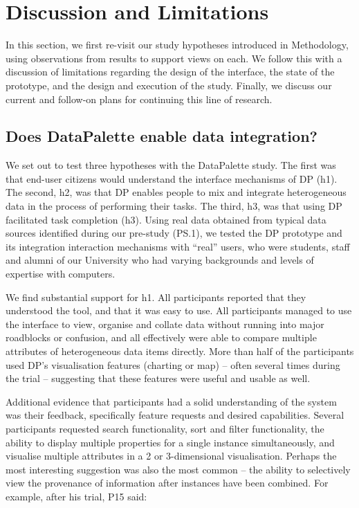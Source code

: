 \documentclass{sigchi}
\begin{document}
\section{Discussion and Limitations}

In this section, we first re-visit our study hypotheses introduced in Methodology, using observations from results to support views on each.  We follow this with a discussion of limitations regarding the design of the interface, the state of the prototype, and the design and execution of the study.  Finally, we discuss our current and follow-on plans for continuing this line of research.

\subsection{Does DataPalette enable data integration?}

We set out to test three hypotheses with the DataPalette study. The first was that end-user citizens would understand the interface mechanisms of DP (h1).  The second, h2, was that DP enables people to mix and integrate heterogeneous data in the process of performing their tasks.  The third, h3, was that using DP facilitated task completion (h3).  Using real data obtained from typical data sources identified during our pre-study (PS.1), we tested the DP prototype and its integration interaction mechanisms with ``real'' users, who were students, staff and alumni of our University who had varying backgrounds and levels of expertise with computers.

We find substantial support for h1. All participants reported that they understood the tool, and that it was easy to use.   All participants managed to use the interface to view, organise and collate data without running into major roadblocks or confusion, and all effectively were able to compare multiple attributes of heterogeneous data items directly.  More than half of the participants used DP's visualisation features (charting or map) -- often several times during the trial -- suggesting that these features were useful and usable as well.  

Additional evidence that participants had a solid understanding of the system was their feedback, specifically feature requests and desired capabilities.  Several participants requested search functionality, sort and filter functionality, the ability to display multiple properties for a single instance simultaneously, and visualise multiple attributes in a 2 or 3-dimensional visualisation.  Perhaps the most interesting suggestion was also the most common -- the ability to selectively view the provenance of information after instances have been combined.  For example, after his trial, P15 said:
\end{document}
